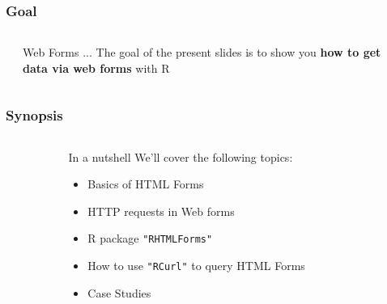 \documentclass{beamer}\usepackage[]{graphicx}\usepackage[]{color}
\newcommand{\code}[1]{\texttt{#1}}
\begin{document}
\begin{frame}
\frametitle{Goal}

\begin{columns}[t]
\begin{column}{0.1\textwidth}
\end{column}
\begin{column}{0.8\textwidth}

\begin{block}{Web Forms ...}
The goal of the present slides is to show you \textbf{how to get data via web forms} with R
\end{block}

\end{column}
\begin{column}{0.1\textwidth}
\end{column}
\end{columns}

\end{frame}


\begin{frame}
\frametitle{Synopsis}

\begin{columns}[t]
\begin{column}{0.1\textwidth}
\end{column}
\begin{column}{0.8\textwidth}

\begin{block}{In a nutshell}
We'll cover the following topics:
\begin{itemize}
 \item Basics of HTML Forms
 \item HTTP requests in Web forms
 \item R package \code{"RHTMLForms"}
 \item How to use \code{"RCurl"} to query HTML Forms
 \item Case Studies
\end{itemize}
\end{block}

\end{column}
\begin{column}{0.1\textwidth}
\end{column}
\end{columns}

\end{frame}
\end{document}
